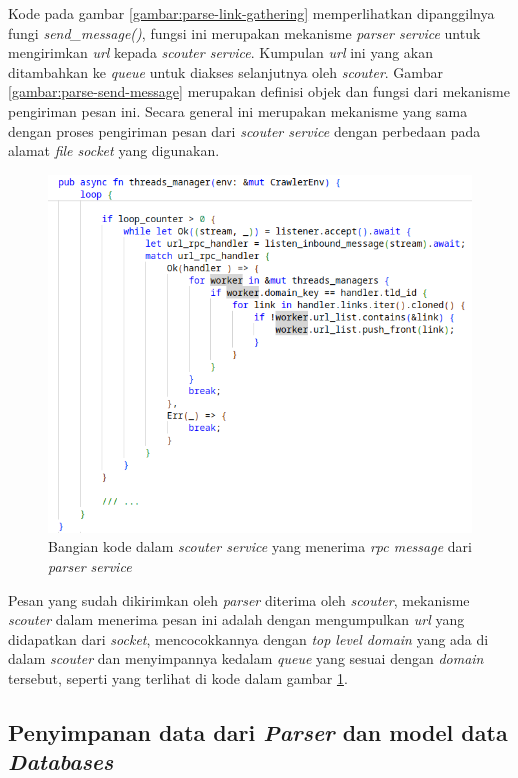 Kode pada gambar \ref{gambar:parse-link-gathering} memperlihatkan dipanggilnya fungi \emph{send\_message()}, fungsi ini merupakan mekanisme \emph{parser service} untuk mengirimkan \emph{url} kepada \emph{scouter service}. Kumpulan \emph{url} ini yang akan ditambahkan ke \emph{queue} untuk diakses selanjutnya oleh \emph{scouter}. Gambar \ref{gambar:parse-send-message} merupakan definisi objek dan fungsi dari mekanisme pengiriman pesan ini. Secara general ini merupakan mekanisme yang sama dengan proses pengiriman pesan dari \emph{scouter service} dengan perbedaan pada alamat \emph{file socket} yang digunakan.

\begin{figure}[H]
  \centering
  \includegraphics[keepaspectratio, width=14cm]{gambar/scouter-listen-links.png}
  \caption{Bangian kode dalam \emph{scouter service} yang menerima \emph{rpc message} dari \emph{parser service}}
  \label{gambar:scouter-listen-link}
\end{figure}

Pesan yang sudah dikirimkan oleh \emph{parser} diterima oleh \emph{scouter}, mekanisme \emph{scouter} dalam menerima pesan ini adalah dengan mengumpulkan \emph{url} yang didapatkan dari \emph{socket}, mencocokkannya dengan \emph{top level domain} yang ada di dalam \emph{scouter} dan menyimpannya kedalam \emph{queue} yang sesuai dengan \emph{domain} tersebut, seperti yang terlihat di kode dalam gambar \ref{gambar:scouter-listen-link}.

\subsection{Penyimpanan data dari \emph{Parser} dan model data \emph{Databases}}

